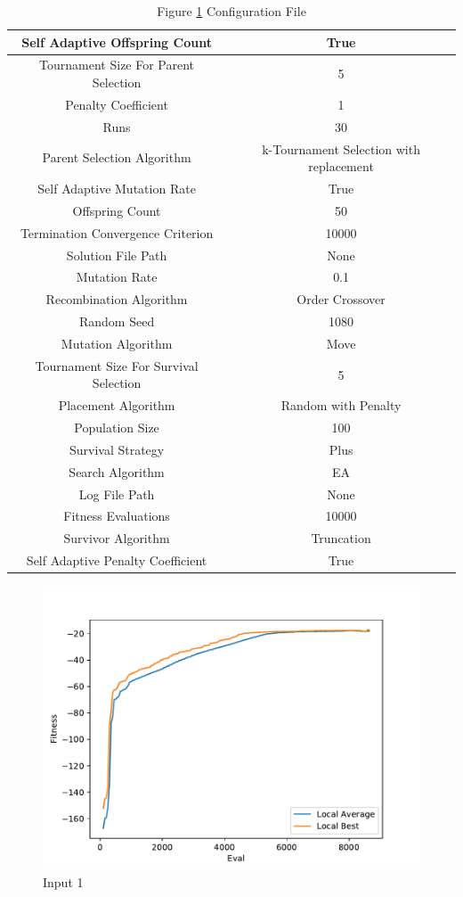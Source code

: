 \documentclass{standalone}
\begin{document}
\begin{table}[!htb]
	\centering
	\caption{Figure \ref{fig:graph_1080} Configuration File}
	\label{tab:graph_1080}
	\begin{tabular}{| c | c |}
		\hline
		Self Adaptive Offspring Count		& True		 \\
		\hline
		Tournament Size For Parent Selection		& 5		 \\
		\hline
		Penalty Coefficient		& 1		 \\
		\hline
		Runs		& 30		 \\
		\hline
		Parent Selection Algorithm		& k-Tournament Selection with replacement		 \\
		\hline
		Self Adaptive Mutation Rate		& True		 \\
		\hline
		Offspring Count		& 50		 \\
		\hline
		Termination Convergence Criterion		& 10000		 \\
		\hline
		Solution File Path		& None		 \\
		\hline
		Mutation Rate		& 0.1		 \\
		\hline
		Recombination Algorithm		& Order Crossover		 \\
		\hline
		Random Seed		& 1080		 \\
		\hline
		Mutation Algorithm		& Move		 \\
		\hline
		Tournament Size For Survival Selection		& 5		 \\
		\hline
		Placement Algorithm		& Random with Penalty		 \\
		\hline
		Population Size		& 100		 \\
		\hline
		Survival Strategy		& Plus		 \\
		\hline
		Search Algorithm		& EA		 \\
		\hline
		Log File Path		& None		 \\
		\hline
		Fitness Evaluations		& 10000		 \\
		\hline
		Survivor Algorithm		& Truncation		 \\
		\hline
		Self Adaptive Penalty Coefficient		& True		 \\
		\hline
	\end{tabular}
\end{table}
\begin{figure}[!htb]
	\caption{Input 1}
	\label{fig:graph_1080}
	\includegraphics[width=\textwidth]{../graphs/graphs/1080.pdf}
\end{figure}


\clearpage
\end{document}
